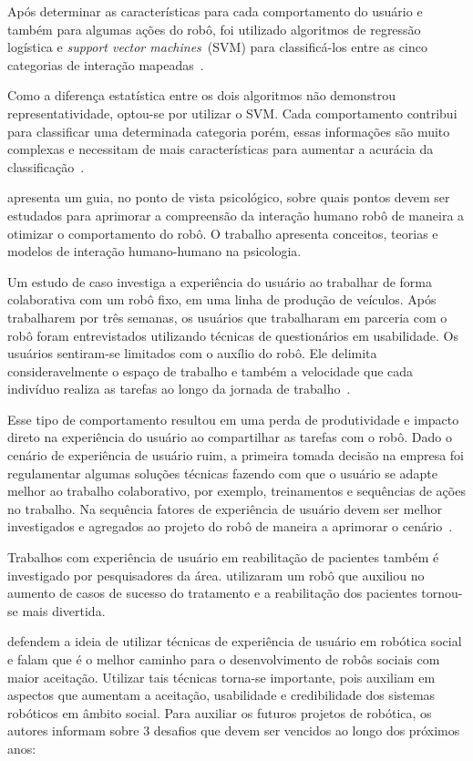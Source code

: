 Após determinar as características para cada comportamento do usuário e também para algumas ações do robô, foi utilizado algoritmos de regressão logística e \emph{support vector machines}~(SVM) para classificá-los entre as cinco categorias de interação mapeadas~\cite{jokinen:2015}.

Como a diferença estatística entre os dois algoritmos não demonstrou representatividade, optou-se por utilizar o SVM. Cada comportamento contribui para classificar uma determinada categoria porém, essas informações são muito complexas e necessitam de mais características para aumentar a acurácia da classificação~\cite{jokinen:2015}.

 apresenta um guia, no ponto de vista psicológico, sobre quais pontos devem ser estudados para aprimorar a compreensão da interação humano robô de maneira a otimizar o comportamento do robô. O trabalho apresenta conceitos, teorias e modelos de interação humano-humano na psicologia.

Um estudo de caso investiga a experiência do usuário ao trabalhar de forma colaborativa com um robô fixo, em uma linha de produção de veículos. Após trabalharem por três semanas, os usuários que trabalharam em parceria com o robô foram entrevistados utilizando técnicas de questionários em usabilidade. Os usuários sentiram-se limitados com o auxílio do robô. Ele delimita consideravelmente o espaço de trabalho e também a velocidade que cada indivíduo realiza as tarefas ao longo da jornada de trabalho~\cite{weiss:2016}.

Esse tipo de comportamento resultou em uma perda de produtividade e impacto direto na experiência do usuário ao compartilhar as tarefas com o robô. Dado o cenário de experiência de usuário ruim, a primeira tomada decisão na empresa foi regulamentar algumas soluções técnicas fazendo com que o usuário se adapte melhor ao trabalho colaborativo, por exemplo, treinamentos e sequências de ações no trabalho. Na sequência fatores de experiência de usuário devem ser melhor investigados e agregados ao projeto do robô de maneira a aprimorar o cenário~\cite{weiss:2016}.

Trabalhos com experiência de usuário em reabilitação de pacientes também é investigado por pesquisadores da área.  utilizaram um robô que auxiliou no aumento de casos de sucesso do tratamento e a reabilitação dos pacientes tornou-se mais divertida.

 defendem a ideia de utilizar técnicas de experiência de usuário em robótica social e falam que é o melhor caminho para o desenvolvimento de robôs sociais com maior aceitação. Utilizar tais técnicas torna-se importante, pois auxiliam em aspectos que aumentam a aceitação, usabilidade e credibilidade dos sistemas robóticos em âmbito social. Para auxiliar os futuros projetos de robótica, os autores informam sobre 3 desafios que devem ser vencidos ao longo dos próximos anos:

